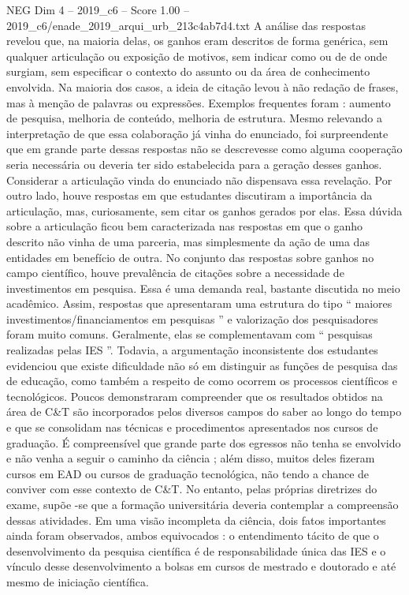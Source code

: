 \begin{textsample}{NEG Dim 4 – 2019\_c6 – Score 1.00 – 2019\_c6/enade\_2019\_arqui\_urb\_213c4ab7d4.txt}
A análise das respostas revelou que, na maioria delas, os ganhos eram descritos de forma genérica, sem qualquer articulação ou exposição de motivos, sem indicar como ou de de onde surgiam, sem especificar o contexto do assunto ou da área de conhecimento envolvida.
Na maioria dos casos, a ideia de citação levou à não redação de frases, mas à menção de palavras ou expressões.
Exemplos frequentes foram : aumento de pesquisa, melhoria de conteúdo, melhoria de estrutura.
Mesmo relevando a interpretação de que essa colaboração já vinha do enunciado, foi surpreendente que em grande parte dessas respostas não se descrevesse como alguma cooperação seria necessária ou deveria ter sido estabelecida para a geração desses ganhos.
Considerar a articulação vinda do enunciado não dispensava essa revelação.
Por outro lado, houve respostas em que estudantes discutiram a importância da articulação, mas, curiosamente, sem citar os ganhos gerados por elas.
Essa dúvida sobre a articulação ficou bem caracterizada nas respostas em que o ganho descrito não vinha de uma parceria, mas simplesmente da ação de uma das entidades em benefício de outra.
No conjunto das respostas sobre ganhos no campo científico, houve prevalência de citações sobre a necessidade de investimentos em pesquisa.
Essa é uma demanda real, bastante discutida no meio acadêmico.
Assim, respostas que apresentaram uma estrutura do tipo “ maiores investimentos/financiamentos em pesquisas ” e valorização dos pesquisadores foram muito comuns.
Geralmente, elas se complementavam com “ pesquisas realizadas pelas IES ”.
Todavia, a argumentação inconsistente dos estudantes evidenciou que existe dificuldade não só em distinguir as funções de pesquisa das de educação, como também a respeito de como ocorrem os processos científicos e tecnológicos.
Poucos demonstraram compreender que os resultados obtidos na área de C\&T são incorporados pelos diversos campos do saber ao longo do tempo e que se consolidam nas técnicas e procedimentos apresentados nos cursos de graduação.
É compreensível que grande parte dos egressos não tenha se envolvido e não venha a seguir o caminho da ciência ; além disso, muitos deles fizeram cursos em EAD ou cursos de graduação tecnológica, não tendo a chance de conviver com esse contexto de C\&T.
No entanto, pelas próprias diretrizes do exame, supõe -se que a formação universitária deveria contemplar a compreensão dessas atividades.
Em uma visão incompleta da ciência, dois fatos importantes ainda foram observados, ambos equivocados : o entendimento tácito de que o desenvolvimento da pesquisa científica é de responsabilidade única das IES e o vínculo desse desenvolvimento a bolsas em cursos de mestrado e doutorado e até mesmo de iniciação científica.

\end{textsample}
